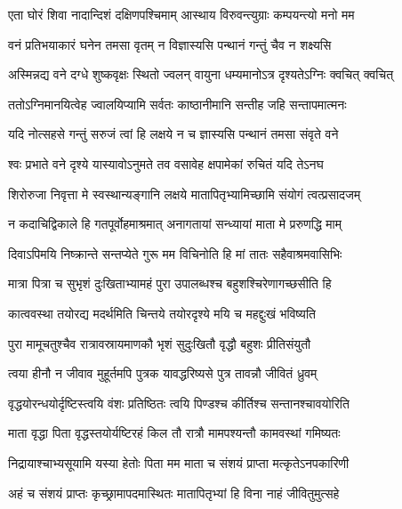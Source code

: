 \twolineshloka
{एता घोरं शिवा नादान्दिशं दक्षिणपश्चिमाम्}
{आस्थाय विरुवन्त्युग्राः कम्पयन्त्यो मनो मम}




\twolineshloka
{वनं प्रतिभयाकारं घनेन तमसा वृतम्}
{न विज्ञास्यसि पन्थानं गन्तुं चैव न शक्ष्यसि}




\twolineshloka
{अस्मिन्नद्य वने दग्धे शुष्कवृक्षः स्थितो ज्वलन्}
{वायुना धम्यमानोऽत्र दृश्यतेऽग्निः क्वचित् क्वचित्}


\twolineshloka
{ततोऽग्निमानयित्वेह ज्वालयिप्यामि सर्वतः}
{काष्ठानीमानि सन्तीह जहि सन्तापमात्मनः}


\twolineshloka
{यदि नोत्सहसे गन्तुं सरुजं त्वां हि लक्षये}
{न च ज्ञास्यसि पन्थानं तमसा संवृते वने}


\twolineshloka
{श्वः प्रभाते वने दृश्ये यास्यावोऽनुमते तव}
{वसावेह क्षपामेकां रुचितं यदि तेऽनघ}




\twolineshloka
{शिरोरुजा निवृत्ता मे स्वस्थान्यङ्गानि लक्षये}
{मातापितृभ्यामिच्छामि संयोगं त्वत्प्रसादजम्}


\twolineshloka
{न कदाचिद्विकाले हि गतपूर्वोहमाश्रमात्}
{अनागतायां सन्ध्यायां माता मे प्ररुणद्धि माम्}


\twolineshloka
{दिवाऽपिमयि निष्क्रान्ते सन्तप्येते गुरू मम}
{विचिनोति हि मां तातः सहैवाश्रमवासिभिः}


\twolineshloka
{मात्रा पित्रा च सुभृशं दुःखिताभ्यामहं पुरा}
{उपालब्धश्च बहुशश्चिरेणागच्छसीति हि}


\twolineshloka
{कात्ववस्था तयोरद्य मदर्थमिति चिन्तये}
{तयोरदृश्ये मयि च महद्दुःखं भविष्यति}


\twolineshloka
{पुरा मामूचतुश्चैव रात्रावस्रायमाणकौ}
{भृशं सुदुःखितौ वृद्धौ बहुशः प्रीतिसंयुतौ}


\twolineshloka
{त्वया हीनौ न जीवाव मुहूर्तमपि पुत्रक}
{यावद्धरिष्यसे पुत्र तावन्नौ जीवितं ध्रुवम्}


\twolineshloka
{वृद्धयोरन्धयोर्दृष्टिस्त्वयि वंशः प्रतिष्ठितः}
{त्वयि पिण्डश्च कीर्तिश्च सन्तानश्चावयोरिति}


\twolineshloka
{माता वृद्धा पिता वृद्धस्तयोर्यष्टिरहं किल}
{तौ रात्रौ मामपश्यन्तौ कामवस्थां गमिष्यतः}


\twolineshloka
{निद्रायाश्चाभ्यसूयामि यस्या हेतोः पिता मम}
{माता च संशयं प्राप्ता मत्कृतेऽनपकारिणी}


\twolineshloka
{अहं च संशयं प्राप्तः कृच्छ्रामापदमास्थितः}
{मातापितृभ्यां हि विना नाहं जीवितुमुत्सहे}


